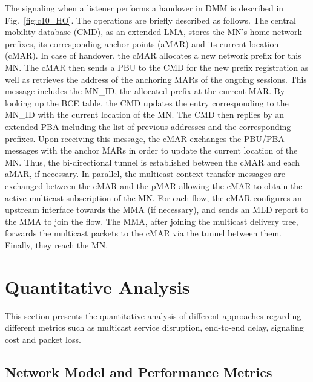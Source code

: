 The signaling when a listener performs a handover in DMM is described in Fig.~\ref{fig:c10_HO}. The operations are briefly described as follows. The central mobility database (CMD), as an extended LMA, stores the MN's home network prefixes, its corresponding anchor points (aMAR) and its current location (cMAR). In case of handover, the cMAR allocates a new network prefix for this MN. The cMAR then sends a PBU to the CMD for the new prefix registration as well as retrieves the address of the anchoring MARs of the ongoing sessions. This message includes the MN\_ID, the allocated prefix at the current MAR. By looking up the BCE table, the CMD updates the entry corresponding to the MN\_ID with the current location of the MN. The CMD then replies by an extended PBA including the list of previous addresses and the corresponding prefixes. Upon receiving this message, the cMAR exchanges the PBU/PBA messages with the anchor MARs in order to update the current location of the MN. Thus, the bi-directional tunnel is established between the cMAR and each aMAR, if necessary. In parallel, the multicast context transfer messages are exchanged between the cMAR and the pMAR allowing the cMAR to obtain the active multicast subscription of the MN. For each flow, the cMAR configures an upstream interface towards the MMA (if necessary), and sends an MLD report to the MMA to join the flow. The MMA, after joining the multicast delivery tree, forwards the multicast packets to the cMAR via the tunnel between them. Finally, they reach the MN. 

\section{Quantitative Analysis} \label{c10:quantitative_analysis}
This section presents the quantitative analysis of different approaches regarding different metrics such as multicast service disruption, end-to-end delay, signaling cost and packet loss. 

\subsection{Network Model and Performance Metrics}
